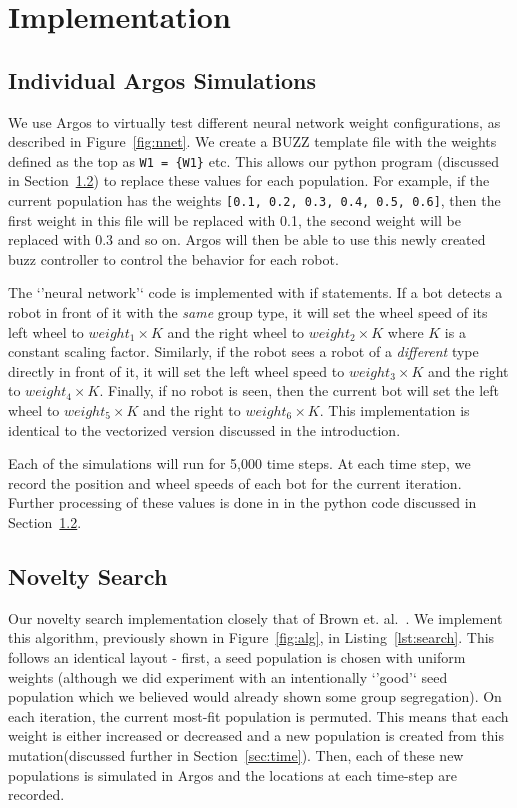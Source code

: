 \section{Implementation}
\label{sec:imp}

\subsection{Individual Argos Simulations}

We use Argos to virtually test different neural network weight configurations, as described in Figure~\ref{fig:nnet}. 
We create a BUZZ template file with the weights defined as the top as \texttt{W1 = \{W1\}} etc.
This allows our python program (discussed in Section~\ref{sec:nov}) to replace these values for each population.
For example, if the current population has the weights \texttt{[0.1, 0.2, 0.3, 0.4, 0.5, 0.6]}, then the first weight in this file will be replaced with 0.1, the second weight will be replaced with 0.3 and so on. 
Argos will then be able to use this newly created buzz controller to control the behavior for each robot. 

The `'neural network'` code is implemented with if statements. 
If a bot detects a robot in front of it with the \emph{same} group type, it will set the wheel speed of its left wheel to $weight_1 \times K$ and the right wheel to $weight_2 \times K$ where $K$ is a constant scaling factor. 
Similarly, if the robot sees a robot of a \emph{different} type directly in front of it, it will set the left wheel speed to $weight_3 \times K$ and the right to $weight_4 \times K$. 
Finally, if no robot is seen, then the current bot will set the left wheel to $weight_5 \times K$ and the right to $weight_6 \times K$. 
This implementation is identical to the vectorized version discussed in the introduction. 

Each of the simulations will run for 5,000 time steps. 
At each time step, we record the position and wheel speeds of each bot for the current iteration. 
Further processing of these values is done in in the python code discussed in Section~\ref{sec:nov}.

\subsection{Novelty Search}
\label{sec:nov}

Our novelty search implementation closely that of Brown et. al.~\cite{c1}.
We implement this algorithm, previously shown in Figure~\ref{fig:alg}, in Listing~\ref{lst:search}.
This follows an identical layout - first, a seed population is chosen with uniform weights (although we did experiment with an intentionally `'good'` seed population which we believed would already shown some group segregation). 
On each iteration, the current most-fit population is permuted.
This means that each weight is either increased or decreased and a new population is created from this mutation(discussed further in Section~\ref{sec:time}).
Then, each of these new populations is simulated in Argos and the locations at each time-step are recorded.

